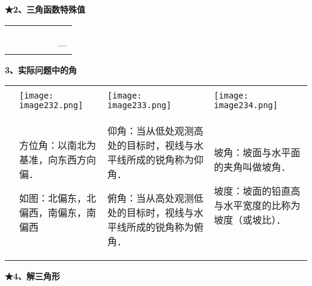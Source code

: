 \textbf{★2、三角函数特殊值}

\begin{longtable}[]{@{}llllll@{}}
\toprule
\endhead
& & & & &\tabularnewline
& & & & &\tabularnewline
& & & & &\tabularnewline
& & & & & ---\tabularnewline
\bottomrule
\end{longtable}

\textbf{3、实际问题中的角}

\begin{longtable}[]{@{}llll@{}}
\toprule
\endhead
& & &\tabularnewline
&
\texttt{[image: image232.png]}
&
\texttt{[image: image233.png]}
&
\texttt{[image: image234.png]}\tabularnewline
\begin{minipage}[t]{0.22\columnwidth}\raggedright
\strut
\end{minipage} & \begin{minipage}[t]{0.22\columnwidth}\raggedright
方位角：以南北为基准，向东西方向偏．

如图：北偏东，北偏西，南偏东，南偏西\strut
\end{minipage} & \begin{minipage}[t]{0.22\columnwidth}\raggedright
仰角：当从低处观测高处的目标时，视线与水平线所成的锐角称为仰角．

俯角：当从高处观测低处的目标时，视线与水平线所成的锐角称为俯角．\strut
\end{minipage} & \begin{minipage}[t]{0.22\columnwidth}\raggedright
坡角：坡面与水平面的夹角叫做坡角．

坡度：坡面的铅直高与水平宽度的比称为坡度（或坡比）．\strut
\end{minipage}\tabularnewline
\bottomrule
\end{longtable}

\textbf{★4、解三角形}

